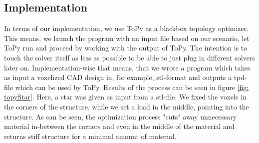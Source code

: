 \subsection{Implementation}%
In terms of our implementation, we use ToPy as a blackbox topology optimizer. This means, we launch the program with an input file based on our scenario, let ToPy run and proceed by working with the output of ToPy. The intention is to touch the solver itself as less as possible to be able to just plug in different solvers later on. Implementation-wise that means, that we wrote a program which takes as input a voxelized CAD design in, for example, stl-format and outputs a tpd-file which can be used by ToPy. Results of the process can be seen in figure \ref{fig: topyStar}. Here, a star was given as input from a stl-file. We fixed the voxels in the corners of the structure, while we set a load in the middle, pointing into the structure. As can be seen, the optimization process "cuts" away unnecessary material in-between the corners and even in the middle of the material and returns stiff structure for a minimal amount of material. 

